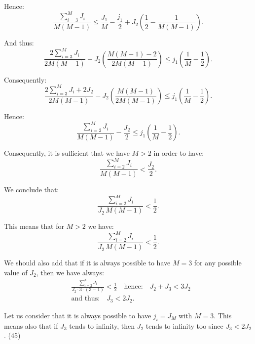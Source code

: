 \documentclass[11pt]{article}
\begin{document}
Hence:
\begin{equation}
\frac{\sum_{i=3}^{M} J_i}{M(M-1)} \leq \frac{J_1}{M} - \frac{j_1}{2} + J_2\left(\frac{1}{2}-\frac{1}{M(M-1)}\right).
\end{equation}

And thus:
\begin{equation}
\frac{2\sum_{i=3}^{M} J_i}{2M(M-1)} - J_2\left(\frac{M(M-1)-2}{2M(M-1)}\right) \leq j_1\left(\frac{1}{M}-\frac{1}{2}\right).
\end{equation}

Consequently:
\begin{equation}
\frac{2\sum_{i=3}^{M} J_i + 2J_2}{2M(M-1)} - J_2\left(\frac{M(M-1)}{2M(M-1)}\right) \leq j_1\left(\frac{1}{M}-\frac{1}{2}\right).
\end{equation}

Hence:
\begin{equation}
\frac{\sum_{i=2}^{M} J_i}{M(M-1)} - \frac{J_2}{2} \leq j_1\left(\frac{1}{M}-\frac{1}{2}\right).
\end{equation}

Consequently, it is sufficient that we have $M>2$ in order to have:
\begin{equation}
\frac{\sum_{i=2}^{M} J_i}{M(M-1)} < \frac{J_2}{2}.
\end{equation}

We conclude that:
\begin{equation}
\frac{\sum_{i=2}^{M} J_i}{J_2\, M(M-1)} < \frac{1}{2}.
\end{equation}

This means that for $M>2$ we have:
\begin{equation}
\frac{\sum_{i=2}^{M} J_i}{J_2\, M(M-1)} < \frac{1}{2}.
\end{equation}

We should also add that if it is always possible to have $M=3$ for any possible value of $J_2$, then we have always:
\begin{equation}
\begin{aligned}&\frac{\sum_{i=2}^{3} J_i}{J_2 \cdot 3 \cdot(3-1)} < \frac{1}{2} \quad\text{hence:}\quad J_2+J_3 < 3J_2\\ &\text{and thus:}\quad J_3 < 2J_2.\end{aligned}
\end{equation}

Let us consider that it is always possible to have $j_i = J_M$ with $M=3$. This means also that if $J_3$ tends to infinity, then $J_2$ tends to infinity too since $J_3 < 2J_2$. \hfill (45)
\end{document}
